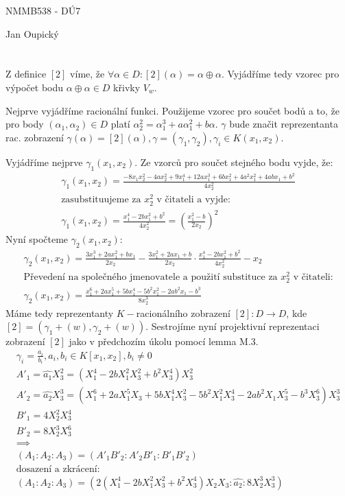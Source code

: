 \documentclass[12pt, a4paper]{article}
\begin{document}
\begin{center}
\large NMMB538 - DÚ7

\normalsize Jan Oupický
\end{center}
\vspace{1\baselineskip}

\section{}
Z definice $[2]$ víme, že $\forall \alpha \in D: [2](\alpha) = \alpha \oplus \alpha$. Vyjádříme tedy vzorec pro výpočet bodu $\alpha \oplus \alpha \in D$ křivky $V_w$.

Nejprve vyjádříme racionální funkci. Použijeme vzorec pro součet bodů a to, že pro body $(\alpha_1, \alpha_2) \in D$ platí $\alpha_2^2 = \alpha_1^3+a \alpha_1^2 + b \alpha$. $\gamma$ bude značit reprezentanta rac. zobrazení $\gamma(\alpha) = [2](\alpha), \gamma = (\gamma_1, \gamma_2), \gamma_i \in K(x_1, x_2)$. 

Vyjádříme nejprve $\gamma_1(x_1,x_2)$. Ze vzorců pro součet stejného bodu vyjde, že:
\begin{gather*}
\gamma_1(x_1,x_2) = \frac{-8x_1x_2^2 - 4ax_2^2 + 9x_1^4+12ax_1^3+6bx_1^2+4a^2x_1^2+4abx_1+b^2}{4x_2^2}\\
\text{zasubstituujeme za $x_2^2$ v čitateli a vyjde:}\\
\gamma_1(x_1,x_2) = \frac{x_1^4-2bx_1^2+b^2}{4x_2^2} = \left( \frac{x_1^2-b}{2x_2} \right)^2
\end{gather*}
Nyní spočteme $\gamma_2(x_1,x_2)$:
\begin{gather*}
\gamma_2(x_1,x_2) = \frac{3x_1^3+2ax_1^2+bx_1}{2x_2}-\frac{3x_1^2+2ax_1+b}{2x_2}\cdot \frac{x_1^4-2bx_1^2+b^2}{4x_2^2}-x_2\\
\text{Převedení na společného jmenovatele a použití substituce za $x_2^2$ v čitateli:}\\
\gamma_2(x_1,x_2) = \frac{x_1^6+2ax_1^5+5bx_1^4-5b^2x_1^2-2ab^2x_1-b^3}{8x_2^3}
\end{gather*}
Máme tedy reprezentanty $K-$racionálního zobrazení $[2]: D \rightarrow D$, kde \\$[2] = (\gamma_1+(w), \gamma_2+(w))$. Sestrojíme nyní projektivní reprezentaci zobrazení $[2]$ jako v předchozím úkolu pomocí lemma M.3.
\begin{gather*}
\gamma_i = \frac{a_i}{b_i}, a_i, b_i \in K[x_1,x_2], b_i \neq 0\\
A'_1 = \widehat{a_1} X_3^2 = (X_1^4-2bX_1^2X_3^2 + b^2X_3^4)X_3^2\\
A'_2 = \widehat{a_2} X_3^3 = (X_1^6+2aX_1^5X_3+5bX_1^4X_3^2-5b^2X_1^2X_3^4-2ab^2X_1X_3^5-b^3X_3^6) X_3^3\\
B'_1 = 4X_2^2X_3^4\\
B'_2 = 8X_2^3X_3^6\\
\implies\\
(A_1 : A_2 : A_3) = (A'_1B'_2 : A'_2B'_1 : B'_1B'_2)\\
\text{dosazení a zkrácení:}\\
(A_1 : A_2 : A_3) = (2(X_1^4-2bX_1^2X_3^2 + b^2X_3^4)X_2X_3 : \widehat{a_2} : 8X_2^3X_3^3)
\end{gather*}
\end{document}
